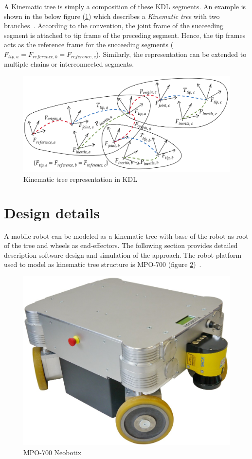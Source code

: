A Kinematic tree is simply a composition of these KDL segments. An example is shown in the below figure (\ref{fig:kinematic-tree}) which describes a \textit{Kinematic tree} with two branches~\cite{kinematictreeKDL}. According to the convention, the joint frame of the succeeding segment is attached to tip frame of the preceding segment. Hence, the tip frames acts as the reference frame for the succeeding segments ($F_{tip, a} = F_{reference, b} = F_{reference, c}$). Similarly, the representation can be extended to multiple chains or interconnected segments. 

\begin{figure}[h!]
	\includegraphics[scale=0.35]{images/kinematic-tree}
	\caption{Kinematic tree representation in KDL}
		\label{fig:kinematic-tree}
\end{figure}


\section{Design details}
A mobile robot can be modeled as a kinematic tree with base of the robot as root of the tree and wheels as end-effectors. The following section provides detailed description software design and simulation of the approach. The robot platform used to model as kinematic tree structure is MPO-700 (figure \ref{fig:MPO-700})~\cite{MPO700}. 

\begin{figure}[h!]
	\centering
	
	\includegraphics[scale=0.4]{images/mp0700}
	\caption{MPO-700 Neobotix}
	\label{fig:MPO-700}
\end{figure}

